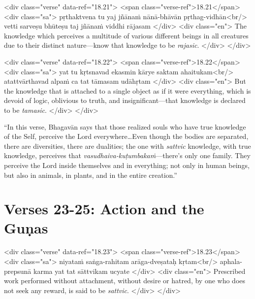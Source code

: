 \begin{html}
<div class="verse" data-ref="18.21">
  <span class="verse-ref">18.21</span>
  <div class="sa">
    pṛthaktvena tu yaj jñānaṁ nānā-bhāvān pṛthag-vidhān<br/>
    vetti sarveṣu bhūteṣu taj jñānaṁ viddhi rājasam
  </div>
  <div class="en">
    The knowledge which perceives a multitude of various different beings in all creatures due to their distinct nature---know that knowledge to be \textit{rajasic}.
  </div>
</div>
\end{html}



\begin{html}
<div class="verse" data-ref="18.22">
  <span class="verse-ref">18.22</span>
  <div class="sa">
    yat tu kṛtsnavad ekasmin kārye saktam ahaitukam<br/>
    atattvārthavad alpaṁ ca tat tāmasam udāhṛtam
  </div>
  <div class="en">
    But the knowledge that is attached to a single object as if it were everything, which is devoid of logic, oblivious to truth, and insignificant---that knowledge is declared to be \textit{tamasic}.
  </div>
</div>
\end{html}


\enquote{In this verse, Bhagavān says that those realized souls who have true knowledge of the Self, perceive the Lord everywhere\ldots Even though the bodies are separated, there are diversities, there are dualities; the one with \textit{sattvic} knowledge, with true knowledge, perceives that \textit{vasudhaiva-kuṭumbakaṁ}---there’s only one family. They perceive the Lord inside themselves and in everything; not only in human beings, but also in animals, in plants, and in the entire creation.}

\section{Verses 23-25: Action and the Guṇas}\label{sec-verses-23-25-action-and-the-gunas}


\begin{html}
<div class="verse" data-ref="18.23">
  <span class="verse-ref">18.23</span>
  <div class="sa">
    niyataṁ saṅga-rahitam arāga-dveṣataḥ kṛtam<br/>
    aphala-prepsunā karma yat tat sāttvikam ucyate
  </div>
  <div class="en">
    Prescribed work performed without attachment, without desire or hatred, by one who does not seek any reward, is said to be \textit{sattvic}.
  </div>
</div>
\end{html}



